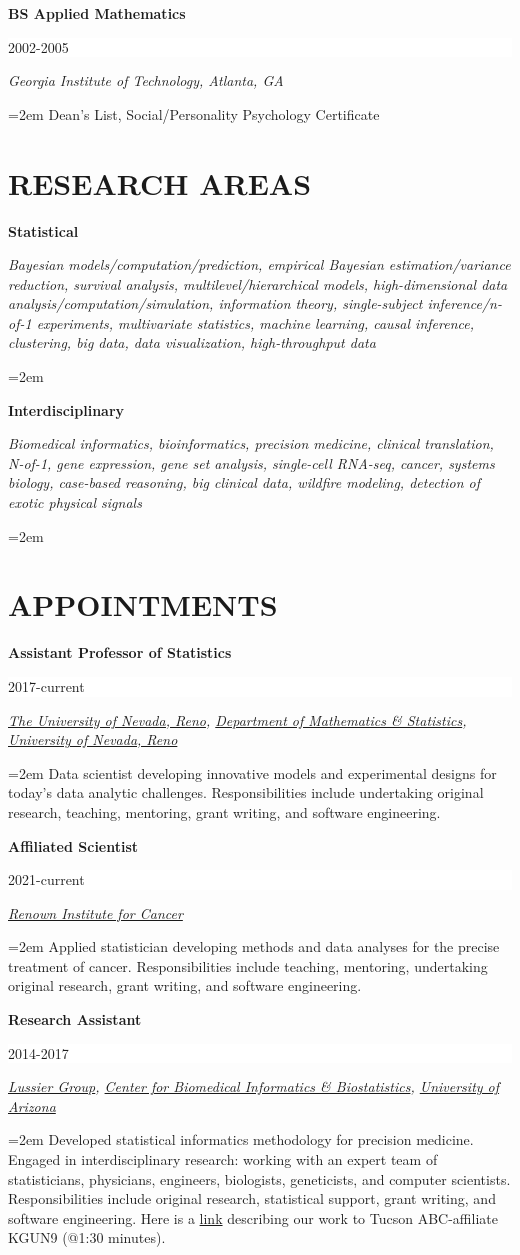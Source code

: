 \documentclass[paper=a4,fontsize=11pt]{scrartcl} %
\newcommand{\sepspace}{\vspace*{1em}}		%
\newcommand{\NewPart}[2]{\section*{\uppercase{#1} #2 }}
\newcommand{\EducationEntry}[4]{
		\noindent \textbf{#1} \hfill      %
		\colorbox{White}{%
			\parbox{6em}{%
			\hfill\color{Black}#2}} \par  %
		\noindent \textit{#3} \par        %
		\noindent\hangindent=2em\hangafter=0 \small #4 %
		\normalsize \par \vspace{-7pt}}
\begin{document}
\EducationEntry{BS Applied Mathematics}{2002-2005}{Georgia Institute of Technology, Atlanta, GA}{Dean's List, Social/Personality Psychology Certificate}

\NewPart{Research areas}{}
\vspace{-7pt}

\EducationEntry{Statistical}{}{Bayesian models/computation/prediction, empirical Bayesian estimation/variance reduction, survival analysis, multilevel/hierarchical models, high-dimensional data analysis/computation/simulation, information theory, single-subject inference/n-of-1 experiments, multivariate statistics, machine learning, causal inference, clustering, big data, data visualization, high-throughput data}{}

\vspace{7pt}

\EducationEntry{Interdisciplinary}{}{Biomedical informatics, bioinformatics, precision medicine, clinical translation, N-of-1, gene expression, gene set analysis, single-cell RNA-seq, cancer, systems biology, case-based reasoning, big clinical data, wildfire modeling, detection of exotic physical signals}{}

\NewPart{Appointments}{}
\vspace{-7pt}

\EducationEntry{Assistant Professor of Statistics}{2017-current}{{\href{https://www.unr.edu/}{The University of Nevada, Reno}}, {\href{https://www.unr.edu/math/}{Department of Mathematics \& Statistics}}, {\href{http://www.unr.edu/}{University of Nevada, Reno}}}{Data scientist developing innovative models and experimental designs for today's data analytic challenges. Responsibilities include undertaking original research, teaching, mentoring, grant writing, and software engineering.}
\sepspace

\EducationEntry{Affiliated Scientist}{2021-current}{{\href{https://www.renown.org/explore/institute-for-cancer/}{Renown Institute for Cancer}}}{Applied statistician developing methods and data analyses for the precise treatment of cancer. Responsibilities include teaching, mentoring, undertaking original research, grant writing, and software engineering.}
\sepspace

\EducationEntry{Research Assistant}{2014-2017}{{\href{http://lussierlab.org/}{Lussier Group}}, {\href{http://cb2.uahs.arizona.edu/}{Center for Biomedical Informatics \& Biostatistics}}, {\href{http://www.arizona.edu/}{University of Arizona}}}{Developed statistical informatics methodology for precision medicine. Engaged in interdisciplinary research: working with an expert team of statisticians, physicians, engineers, biologists, geneticists, and computer scientists. Responsibilities include original research, statistical support, grant writing, and software engineering. Here is a \href{http://cb2.uahs.arizona.edu/news/dr-lussier-and-grant-schissler-speak-big-data-kgun9-local-news}{link} describing our work to Tucson ABC-affiliate KGUN9 (@1:30 minutes).}
\sepspace
\end{document}
